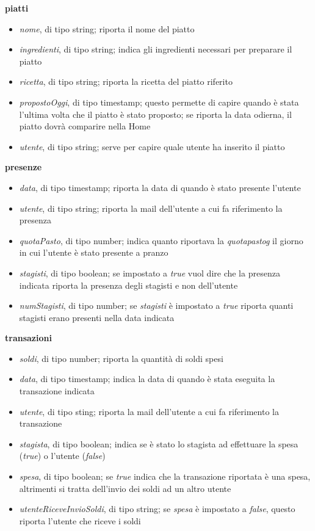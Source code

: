 \noindent \textbf{piatti}
\begin{itemize}
    \item \emph{nome}, di tipo string; riporta il nome del piatto
    \item \emph{ingredienti}, di tipo string; indica gli ingredienti necessari per preparare il piatto
    \item \emph{ricetta}, di tipo string; riporta la ricetta del piatto riferito
    \item \emph{propostoOggi}, di tipo timestamp; questo permette di capire quando è stata l'ultima volta che il piatto è stato proposto; se riporta la data odierna, il piatto dovrà comparire nella Home
    \item \emph{utente}, di tipo string; serve per capire quale utente ha inserito il piatto
\end{itemize}

\noindent \textbf{presenze}
\begin{itemize}
    \item \emph{data}, di tipo timestamp; riporta la data di quando è stato presente l'utente
    \item \emph{utente}, di tipo string; riporta la mail dell'utente a cui fa riferimento la presenza
    \item \emph{quotaPasto}, di tipo number; indica quanto riportava la \emph{\gls{quotapastog}} il giorno in cui l'utente è stato presente a pranzo
    \item \emph{stagisti}, di tipo boolean; se impostato a \emph{true} vuol dire che la presenza indicata riporta la presenza degli stagisti e non dell'utente
    \item \emph{numStagisti}, di tipo number; se \emph{stagisti} è impostato a \emph{true} riporta quanti stagisti erano presenti nella data indicata
\end{itemize}

\newpage

\noindent \textbf{transazioni}
\begin{itemize}
    \item \emph{soldi}, di tipo number; riporta la quantità di soldi spesi
    \item \emph{data}, di tipo timestamp; indica la data di quando è stata eseguita la transazione indicata
    \item \emph{utente}, di tipo sting; riporta la mail dell'utente a cui fa riferimento la transazione
    \item \emph{stagista}, di tipo boolean; indica se è stato lo stagista ad effettuare la spesa (\emph{true}) o l'utente (\emph{false})
    \item \emph{spesa}, di tipo boolean; se \emph{true} indica che la transazione riportata è una spesa, altrimenti si tratta dell'invio dei soldi ad un altro utente
    \item \emph{utenteRiceveInvioSoldi}, di tipo string; se \emph{spesa} è impostato a \emph{false}, questo riporta l'utente che riceve i soldi
\end{itemize}

